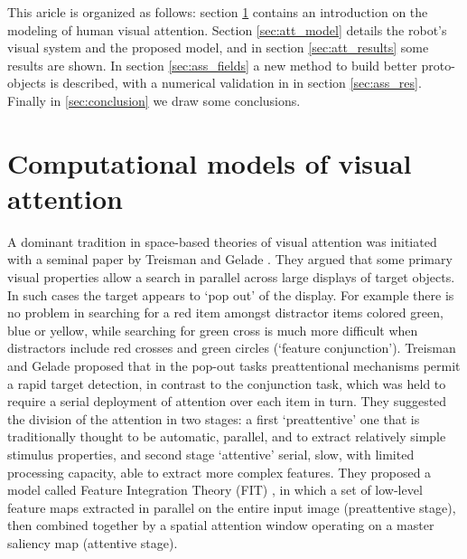 \documentclass{llncs}
\begin{document}

This aricle is organized as follows:
section \ref{sec:att_comp_models} contains an introduction on the modeling of
human visual attention. Section \ref{sec:att_model}
details the robot's visual system and the
proposed model, and in section \ref{sec:att_results} some results are shown.
In section \ref{sec:ass_fields} a new method to build better proto-objects is described,
with a numerical validation in in section \ref{sec:ass_res}. Finally in \ref{sec:conclusion}
we draw some conclusions.


\section{Computational models of visual attention}
\label{sec:att_comp_models}

A dominant tradition in space-based theories of visual attention was initiated
with a seminal paper by Treisman and Gelade \cite{TreismanG80}. They argued
that some primary visual properties allow a search in parallel across large
displays of target objects. In such cases the target appears to `pop out' of
the display. For example there is no problem in searching for a red item
amongst distractor items colored green, blue or yellow, while searching for
green cross is much more difficult when distractors include red crosses and
green circles (`feature conjunction').
Treisman and Gelade proposed that in the pop-out tasks preattentional mechanisms
permit a rapid target detection, in contrast to the conjunction task, which was held
to require a serial deployment of attention over each item in turn.
They suggested the division of the attention in two stages: a first `preattentive' one that is traditionally thought to be
automatic, parallel, and to extract relatively simple stimulus properties, and second stage
`attentive' serial, slow, with limited processing capacity, able to extract more complex features.
They proposed a model called Feature Integration Theory (FIT) \cite{TreismanG80},
in which a set of low-level feature maps extracted
in parallel on the entire input image (preattentive stage), then combined
together by a spatial attention window operating on a
master saliency map (attentive stage).
\end{document}
